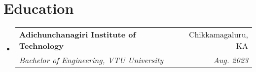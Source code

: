 \documentclass[letterpaper,11pt]{article}
\makeatletter
\newcommand{\resumeSubheading}[4]{
  \vspace{-2pt}\item
    \begin{tabular*}{0.97\textwidth}[t]{l@{\extracolsep{\fill}}r}
      \textbf{#1} & #2 \\
      \textit{\small#3} & \textit{\small #4} \\
    \end{tabular*}\vspace{-7pt}
}
\newcommand{\resumeSubHeadingListStart}{\begin{itemize}[leftmargin=0.15in, label={}]}
\newcommand{\resumeSubHeadingListEnd}{\end{itemize}}
\makeatother
\begin{document}
\section{Education}
  \resumeSubHeadingListStart
    \resumeSubheading
      {Adichunchanagiri Institute of Technology}{Chikkamagaluru, KA}
      {Bachelor of Engineering, VTU University}{Aug. 2023}
  \resumeSubHeadingListEnd


\end{document}

